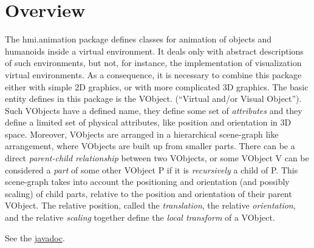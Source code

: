 \section{Overview}

The hmi.animation package defines classes for animation of objects and humanoids inside
a virtual environment. It deals only with abstract descriptions of such environments,
but not, for instance, the implementation of visualization virtual environments.
As a consequence, it is necessary to combine this package either with
simple 2D graphics, or with more complicated 3D graphics.
The basic entity defines in this package is the VObject. (``Virtual and/or Visual Object'').
Such VObjects have a defined name, they define some set of \emph{attributes} and they define a
limited set of physical attributes, like position and orientation in 3D space.
Moreover, VObjects are arranged in a hierarchical scene-graph like arrangement,
where VObjects are built up from smaller parts.
There can be a direct \emph{parent-child relationship} between two VObjects, or some
VObject V can be considered a \emph{part} of some other VObject P if it is \emph{recursively}
a child of P.
This scene-graph takes into account the positioning and orientation (and possibly scaling) of child parts, relative
to the position and orientation of their parent VObject.
The relative position, called the \emph{translation}, the relative \emph{orientation}, and the relative \emph{scaling} together define the \emph{local transform} of a VObject.

See the \href{\webserver}{javadoc}.

